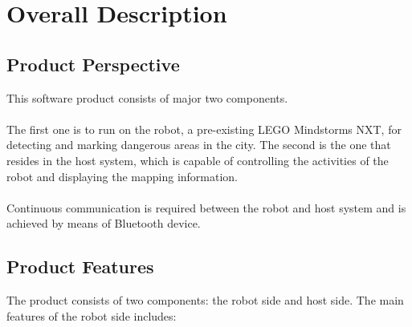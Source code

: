 \documentclass[titlepage]{article}
\begin{document}

\section{Overall Description}
\subsection{Product Perspective}
This software product consists of major two components.\\
\\
The first one is to run on the robot, a pre-existing LEGO Mindstorms NXT, for detecting and marking dangerous areas in the city.
 The second is the one that resides in the host system, which is capable of controlling the activities of the robot and displaying the mapping information.\\
\\
Continuous communication is required between the robot and host system and is achieved by means of Bluetooth device.\\
\subsection{Product Features}
The product consists of two components: the robot side and host side.
The main features of the robot side includes:
\end{document}
